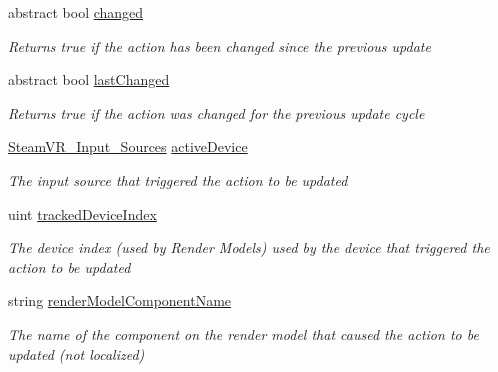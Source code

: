 \begin{DoxyCompactItemize}
abstract bool \mbox{\hyperlink{class_valve_1_1_v_r_1_1_steam_v_r___action___in___source_addbe6ad31b3951c8f426714bacf9a23c}{changed}}
\begin{DoxyCompactList}\small\item\em Returns true if the action has been changed since the previous update \end{DoxyCompactList}\item 
abstract bool \mbox{\hyperlink{class_valve_1_1_v_r_1_1_steam_v_r___action___in___source_afdd5358ed142b133681fe61a9bb16d5c}{last\+Changed}}
\begin{DoxyCompactList}\small\item\em Returns true if the action was changed for the previous update cycle \end{DoxyCompactList}\item 
\mbox{\hyperlink{namespace_valve_1_1_v_r_a82e5bf501cc3aa155444ee3f0662853f}{Steam\+V\+R\+\_\+\+Input\+\_\+\+Sources}} \mbox{\hyperlink{class_valve_1_1_v_r_1_1_steam_v_r___action___in___source_acc6d38cc8824491cc45e809fa92922dc}{active\+Device}}
\begin{DoxyCompactList}\small\item\em The input source that triggered the action to be updated \end{DoxyCompactList}\item 
uint \mbox{\hyperlink{class_valve_1_1_v_r_1_1_steam_v_r___action___in___source_ac20f6924626847c3957ad5b9092e5243}{tracked\+Device\+Index}}
\begin{DoxyCompactList}\small\item\em The device index (used by Render Models) used by the device that triggered the action to be updated \end{DoxyCompactList}\item 
string \mbox{\hyperlink{class_valve_1_1_v_r_1_1_steam_v_r___action___in___source_af15b7b53084c8385e25203b4d8ccc986}{render\+Model\+Component\+Name}}
\begin{DoxyCompactList}\small\item\em The name of the component on the render model that caused the action to be updated (not localized) \end{DoxyCompactList}\item 

\end{DoxyCompactItemize}
